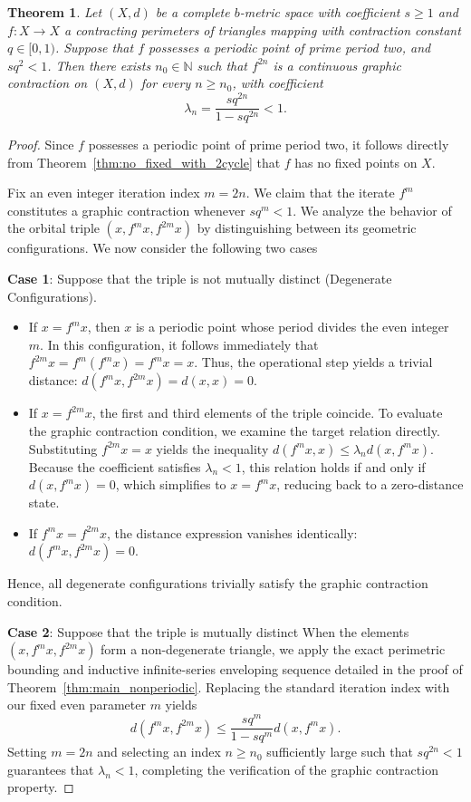 \documentclass[a4paper,12pt,oneside]{article}
\newtheorem{theorem}{Theorem}[section]
\numberwithin{equation}{section}
\begin{document}
\begin{theorem}
\label{thm:even_iterates}
Let $(X,d)$ be a complete $b$-metric space with coefficient $s\geq 1$ and  $f:X\to X$  a contracting perimeters of triangles mapping with contraction constant $q\in [0,1)$. Suppose that $f$ possesses a periodic point of prime period two, and  $sq^{2}< 1$. Then there exists $n_0\in \mathbb{N}$ such that $f^{2n}$ is a continuous graphic contraction on $(X,d)$ for every $n\geq n_0$, with coefficient
\[
\lambda_n = \frac{s q^{2n}}{1 - s q^{2n}} < 1.
\]
\end{theorem}

\begin{proof}
Since $f$ possesses a periodic point of prime period two, it follows directly from Theorem~\ref{thm:no_fixed_with_2cycle} that $f$ has no fixed points on $X$.

Fix an even integer iteration index $m=2n$. We claim that the iterate $f^m$ constitutes a graphic contraction whenever $s q^m < 1$. We analyze the behavior of the orbital triple $(x, f^m x, f^{2m} x)$ by distinguishing between its geometric configurations. We now consider the following two cases

\medskip\noindent
\textbf{Case 1}: Suppose that the triple is not mutually distinct (Degenerate Configurations).
\begin{itemize}
    \item If $x = f^m x$, then $x$ is a periodic point whose period divides the even integer $m$. In this configuration, it follows immediately that $f^{2m}x = f^m(f^mx) = f^mx = x$. Thus, the operational step yields a trivial distance: $d(f^m x, f^{2m} x) = d(x, x) = 0$.
    \item If $x = f^{2m} x$, the first and third elements of the triple coincide. To evaluate the graphic contraction condition, we examine the target relation directly. Substituting $f^{2m}x = x$ yields the inequality $d(f^m x, x) \le \lambda_n d(x, f^m x)$. Because the coefficient satisfies $\lambda_n < 1$, this relation holds if and only if $d(x, f^m x) = 0$, which simplifies to $x = f^m x$, reducing back to a zero-distance state.
    \item If $f^m x = f^{2m} x$, the distance expression vanishes identically: $d(f^m x, f^{2m} x) = 0$.
\end{itemize}
Hence, all degenerate configurations trivially satisfy the graphic contraction condition.

\medskip\noindent
\textbf{Case 2}: Suppose that the triple is mutually distinct
When the elements $(x, f^m x, f^{2m} x)$ form a non-degenerate triangle, we apply the exact perimetric bounding and inductive infinite-series enveloping sequence detailed in the proof of Theorem~\ref{thm:main_nonperiodic}. Replacing the standard iteration index with our fixed even parameter $m$ yields
\[
d(f^m x, f^{2m} x) \le \frac{s q^m}{1 - s q^m} d(x, f^m x).
\]
Setting $m=2n$ and selecting an index $n \ge n_0$ sufficiently large such that $s q^{2n}<1$ guarantees that $\lambda_n < 1$, completing the verification of the graphic contraction property.


\end{proof}
\end{document}
